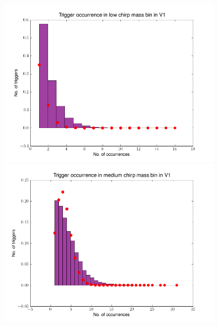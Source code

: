\documentclass[epsf]{article}
\begin{document}
\begin{figure}[ht!]
\begin{minipage}[b]{0.5\linewidth}
\centering
\includegraphics[scale=0.45]{v1_low_distribution.png}
\end{minipage}
\begin{minipage}[b]{0.5\linewidth}
\centering
\includegraphics[scale=0.45]{v1_medium_distribution.png}
\end{minipage}

\end{figure}
\end{document}

